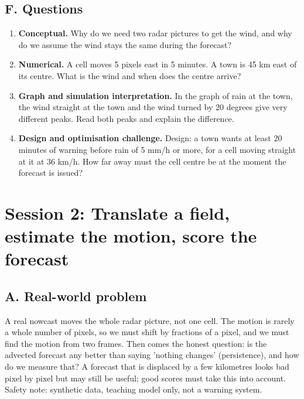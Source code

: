 \documentclass[11pt,a4paper]{article}
\begin{document}
\subsection*{F. Questions}
\begin{enumerate}[nosep]
\item \textbf{Conceptual.} Why do we need two radar pictures to get the wind, and why do we assume the wind stays the same during the forecast?
\item \textbf{Numerical.} A cell moves 5 pixels east in 5 minutes. A town is 45 km east of its centre. What is the wind and when does the centre arrive?
\item \textbf{Graph and simulation interpretation.} In the graph of rain at the town, the wind straight at the town and the wind turned by 20 degrees give very different peaks. Read both peaks and explain the difference.
\item \textbf{Design and optimisation challenge.} Design: a town wants at least 20 minutes of warning before rain of 5 mm/h or more, for a cell moving straight at it at 36 km/h. How far away must the cell centre be at the moment the forecast is issued?
\end{enumerate}

\section{Session 2: Translate a field, estimate the motion, score the forecast}

\subsection*{A. Real-world problem}
A real nowcast moves the whole radar picture, not one cell. The motion is rarely a whole number of pixels, so we must shift by fractions of a pixel, and we must find the motion from two frames. Then comes the honest question: is the advected forecast any better than saying 'nothing changes' (persistence), and how do we measure that? A forecast that is displaced by a few kilometres looks bad pixel by pixel but may still be useful; good scores must take this into account. Safety note: synthetic data, teaching model only, not a warning system.
\end{document}
